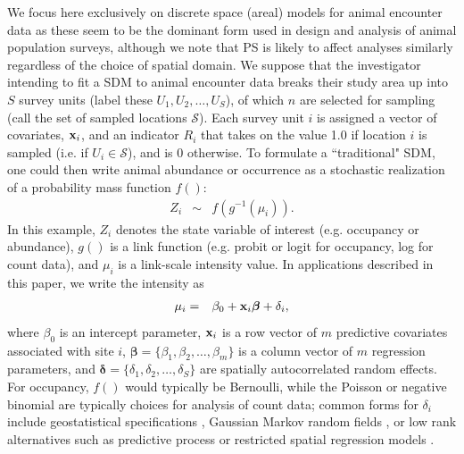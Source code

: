 \documentclass[times,mee,doublespace,]{besauth2}
\begin{document}
We focus here exclusively on discrete space (areal) models for animal encounter data as these seem to be the dominant form used in design and analysis of animal population surveys, although we note that PS is likely to affect analyses similarly regardless of the choice of spatial domain.  We suppose that the investigator intending to fit a SDM to animal encounter data breaks their study area up into $S$ survey units (label these $U_1, U_2, \hdots, U_S$), of which $n$ are selected for sampling (call the set of sampled locations $\mathcal{S}$). Each survey unit $i$ is assigned a vector of covariates, ${\bf x}_i$, and an indicator $R_i$ that takes on the value 1.0 if location $i$ is sampled (i.e. if $U_i \in \mathcal{S}$), and is 0 otherwise.  To formulate a ``traditional" SDM, one could then write animal abundance or occurrence as a stochastic realization of a probability mass function $f()$:
\begin{eqnarray}
  \label{eq:process}
  Z_i & \sim & f(g^{-1}(\mu_i)).
\end{eqnarray}
In this example, $Z_i$ denotes the state variable of interest (e.g. occupancy or abundance), $g()$ is a link function (e.g. probit or logit for occupancy, log for count data), and $\mu_i$ is a link-scale intensity value.  In applications described in this paper, we write the intensity as
\begin{eqnarray}
\mu_i & = & \beta_0 + {\bf x}_i \boldsymbol{\beta}+\delta_i,
 \label{eq:mu}
\end{eqnarray}
where $\beta_0$ is an intercept parameter, ${\bf x}_i$ is a row vector of $m$ predictive covariates associated with site $i$, $\boldsymbol{\beta} = \{ \beta_1, \beta_2, \hdots, \beta_m \}$ is a column vector of $m$ regression parameters, and $\boldsymbol{\delta}=\{ \delta_1,\delta_2,\hdots,\delta_S \}$ are spatially autocorrelated random effects.  For occupancy, $f()$ would typically be Bernoulli, while the Poisson or negative binomial are typically choices for analysis of count data; common forms for $\delta_i$ include geostatistical specifications \citep{Cressie1993,DiggleEtAl1998}, Gaussian Markov random fields \citep[e.g. conditionally autoregressive models;][]{RueHeld2005}, or low rank alternatives such as predictive process \citep{BanerjeeEtAl2008,LatimerEtAl2009} or restricted spatial regression models \citep{Reich2006,Hughes2013}.
\end{document}
